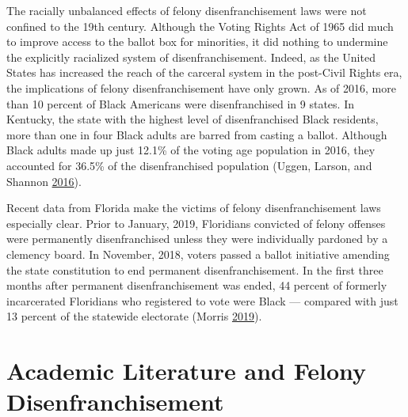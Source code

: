 \documentclass[]{article}
\begin{document}
The racially unbalanced effects of felony disenfranchisement laws were not confined to the 19th century. Although the Voting Rights Act of 1965 did much to improve access to the ballot box for minorities, it did nothing to undermine the explicitly racialized system of disenfranchisement. Indeed, as the United States has increased the reach of the carceral system in the post-Civil Rights era, the implications of felony disenfranchisement have only grown. As of 2016, more than 10 percent of Black Americans were disenfranchised in 9 states. In Kentucky, the state with the highest level of disenfranchised Black residents, more than one in four Black adults are barred from casting a ballot. Although Black adults made up just 12.1\% of the voting age population in 2016, they accounted for 36.5\% of the disenfranchised population (Uggen, Larson, and Shannon \protect\hyperlink{ref-sentencing_2016}{2016}).

Recent data from Florida make the victims of felony disenfranchisement laws especially clear. Prior to January, 2019, Floridians convicted of felony offenses were permanently disenfranchised unless they were individually pardoned by a clemency board. In November, 2018, voters passed a ballot initiative amending the state constitution to end permanent disenfranchisement. In the first three months after permanent disenfranchisement was ended, 44 percent of formerly incarcerated Floridians who registered to vote were Black --- compared with just 13 percent of the statewide electorate (Morris \protect\hyperlink{ref-Morris2019}{2019}).

\hypertarget{academic-literature-and-felony-disenfranchisement}{%
\section{Academic Literature and Felony Disenfranchisement}\label{academic-literature-and-felony-disenfranchisement}}
\end{document}
